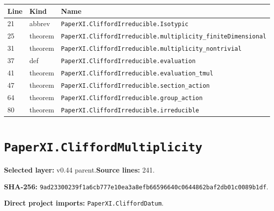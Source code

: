 \documentclass[10pt,oneside]{book}
\begin{document}
\begin{longtable}{@{}p{}p{}p{}@{}}\toprule Line&Kind&Name\\\midrule\endhead

21&abbrev&\nolinkurl{PaperXI.CliffordIrreducible.Isotypic}\\

25&theorem&\nolinkurl{PaperXI.CliffordIrreducible.multiplicity_finiteDimensional}\\

31&theorem&\nolinkurl{PaperXI.CliffordIrreducible.multiplicity_nontrivial}\\

37&def&\nolinkurl{PaperXI.CliffordIrreducible.evaluation}\\

41&theorem&\nolinkurl{PaperXI.CliffordIrreducible.evaluation_tmul}\\

47&theorem&\nolinkurl{PaperXI.CliffordIrreducible.section_action}\\

64&theorem&\nolinkurl{PaperXI.CliffordIrreducible.group_action}\\

80&theorem&\nolinkurl{PaperXI.CliffordIrreducible.irreducible}\\

\bottomrule\end{longtable}

\section{\texorpdfstring{\nolinkurl{PaperXI.CliffordMultiplicity}}{PaperXI.CliffordMultiplicity}}\label{module:PaperXI.CliffordMultiplicity}

\textbf{Selected layer:} v0.44 parent.\quad\textbf{Source lines:} 241.\par\textbf{SHA-256:} {\scriptsize\nolinkurl{9ad23300239f1a6cb777e10ea3a8efb66596640c0644862baf2db01c0089b1df}}.


\textbf{Direct project imports:} \nolinkurl{PaperXI.CliffordDatum}.
\end{document}
